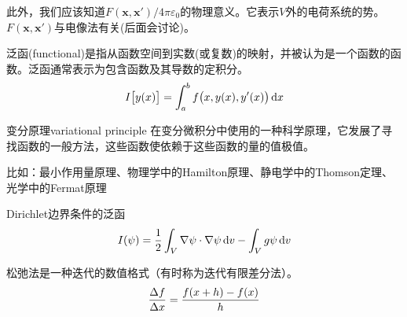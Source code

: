 此外，我们应该知道$F(\bm x, \bm x')/4\pi\varepsilon_0$的物理意义。它表示$V$外的电荷系统的势。$F(\bm x, \bm x')$与电像法有关(后面会讨论)。


泛函(functional)是指从函数空间到实数(或复数)的映射，并被认为是一个函数的函数。泛函通常表示为包含函数及其导数的定积分。
\begin{align}
    I\bigl[y(x)\bigr]=\int_a^bf\bigl(x,y(x),y'(x)\bigr)\mathop{}\!\mathrm{d} x
\end{align}
\begin{definition}{变分原理}{variational principle}
    在变分微积分中使用的一种科学原理，它发展了寻找函数的一般方法，这些函数使依赖于这些函数的量的值极值。

    比如：最小作用量原理、物理学中的Hamilton原理、静电学中的Thomson定理、光学中的Fermat原理
\end{definition}
Dirichlet边界条件的泛函
\[
    I(\psi)=\frac12\int_V\nabla\psi\cdot\nabla\psi\mathop{}\!\mathrm{d} v-\int_Vg\psi\mathop{}\!\mathrm{d} v
\]


松弛法是一种迭代的数值格式（有时称为迭代有限差分法）。
\[
    \frac{\Delta f}{\Delta x}=\frac{f(x+h)-f(x)}h
\]

